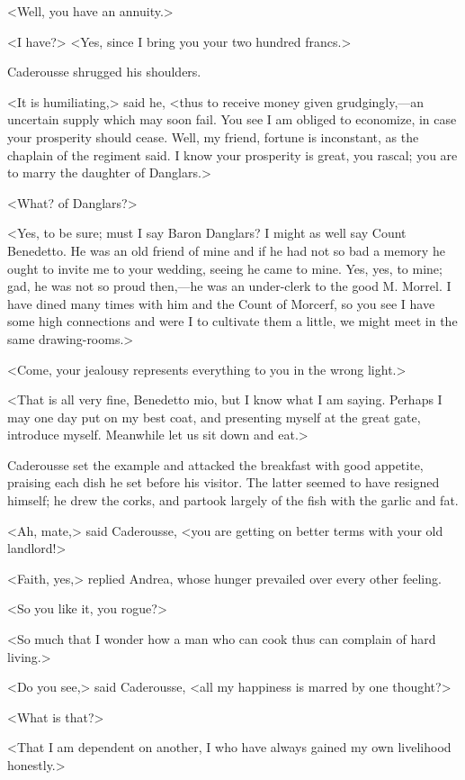 <Well, you have an annuity.> 

 <I have?>  <Yes, since I bring you your two hundred francs.> 

 Caderousse shrugged his shoulders. 

 <It is humiliating,> said he, <thus to receive money given grudgingly,—an uncertain supply which may soon fail. You see I am obliged to economize, in case your prosperity should cease. Well, my friend, fortune is inconstant, as the chaplain of the regiment said. I know your prosperity is great, you rascal; you are to marry the daughter of Danglars.> 

 <What? of Danglars?> 

 <Yes, to be sure; must I say Baron Danglars? I might as well say Count Benedetto. He was an old friend of mine and if he had not so bad a memory he ought to invite me to your wedding, seeing he came to mine. Yes, yes, to mine; gad, he was not so proud then,—he was an under-clerk to the good M. Morrel. I have dined many times with him and the Count of Morcerf, so you see I have some high connections and were I to cultivate them a little, we might meet in the same drawing-rooms.> 

 <Come, your jealousy represents everything to you in the wrong light.> 

 <That is all very fine, Benedetto mio, but I know what I am saying. Perhaps I may one day put on my best coat, and presenting myself at the great gate, introduce myself. Meanwhile let us sit down and eat.> 

 Caderousse set the example and attacked the breakfast with good appetite, praising each dish he set before his visitor. The latter seemed to have resigned himself; he drew the corks, and partook largely of the fish with the garlic and fat. 

 <Ah, mate,> said Caderousse, <you are getting on better terms with your old landlord!> 

 <Faith, yes,> replied Andrea, whose hunger prevailed over every other feeling. 

 <So you like it, you rogue?> 

 <So much that I wonder how a man who can cook thus can complain of hard living.> 

 <Do you see,> said Caderousse, <all my happiness is marred by one thought?> 

 <What is that?> 

 <That I am dependent on another, I who have always gained my own livelihood honestly.> 

